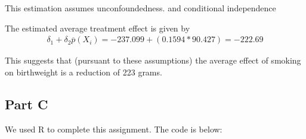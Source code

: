 \documentclass[letterpaper, 12pt]{article}
\begin{document}
This estimation assumes unconfoundedness. and conditional independence



The estimated average treatment effect is given by 
\begin{align*}
\delta_1 + \delta_2 \overbar{p}(X_i)=
 -237.099 + (0.1594*90.427)=
-222.69
\end{align*}

This suggests that (pursuant to these assumptions) the average effect of smoking on birthweight is a reduction of 223 grams.

\subsection{Part C}





We used R to complete this assignment.  The code is below:




\end{document}
